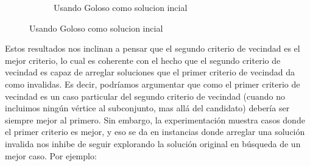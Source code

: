 \begin{itemize}
\begin{figure}[H]
\begin{subfigure}[b]{0.5\textwidth}
                \caption{Usando Goloso como solucion incial}
        \end{subfigure}

\end{figure}


\end{itemize}



Estos resultados nos inclinan a pensar que el segundo criterio de vecindad es el mejor criterio, lo cual es coherente con el hecho que el segundo criterio de vecindad es capaz de arreglar soluciones que el primer criterio de vecindad da como invalidas. Es decir, podríamos argumentar que como el primer criterio de vecindad es un caso particular del segundo criterio de vecindad (cuando no incluimos ningún vértice al subconjunto, mas allá del candidato) debería ser siempre mejor al primero. Sin embargo, la experimentación muestra casos donde el primer criterio es mejor, y eso se da en instancias donde arreglar una solución invalida nos inhibe de seguir explorando la solución original en búsqueda de un mejor caso. Por ejemplo:

